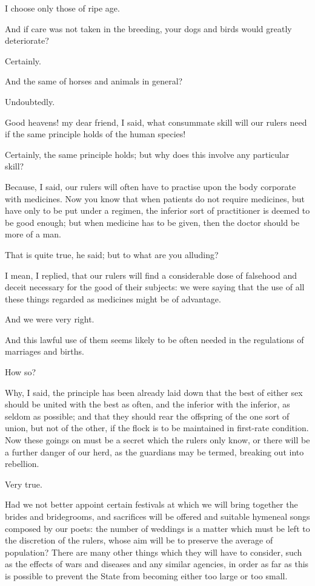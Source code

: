 I choose only those of ripe age.

And if care was not taken in the breeding, your dogs and birds would
greatly deteriorate?

Certainly.

And the same of horses and animals in general?

Undoubtedly.

Good heavens! my dear friend, I said, what consummate skill will our
rulers need if the same principle holds of the human species!

Certainly, the same principle holds; but why does this involve any
particular skill?

Because, I said, our rulers will often have to practise upon the body
corporate with medicines. Now you know that when patients do not require
medicines, but have only to be put under a regimen, the inferior sort
of practitioner is deemed to be good enough; but when medicine has to be
given, then the doctor should be more of a man.

That is quite true, he said; but to what are you alluding?

I mean, I replied, that our rulers will find a considerable dose of
falsehood and deceit necessary for the good of their subjects: we were
saying that the use of all these things regarded as medicines might be
of advantage.

And we were very right.

And this lawful use of them seems likely to be often needed in the
regulations of marriages and births.

How so?

Why, I said, the principle has been already laid down that the best of
either sex should be united with the best as often, and the inferior
with the inferior, as seldom as possible; and that they should rear the
offspring of the one sort of union, but not of the other, if the flock
is to be maintained in first-rate condition. Now these goings on must be
a secret which the rulers only know, or there will be a further
danger of our herd, as the guardians may be termed, breaking out into
rebellion.

Very true.

Had we not better appoint certain festivals at which we will bring
together the brides and bridegrooms, and sacrifices will be offered and
suitable hymeneal songs composed by our poets: the number of weddings is
a matter which must be left to the discretion of the rulers, whose aim
will be to preserve the average of population? There are many other
things which they will have to consider, such as the effects of wars and
diseases and any similar agencies, in order as far as this is possible
to prevent the State from becoming either too large or too small.

